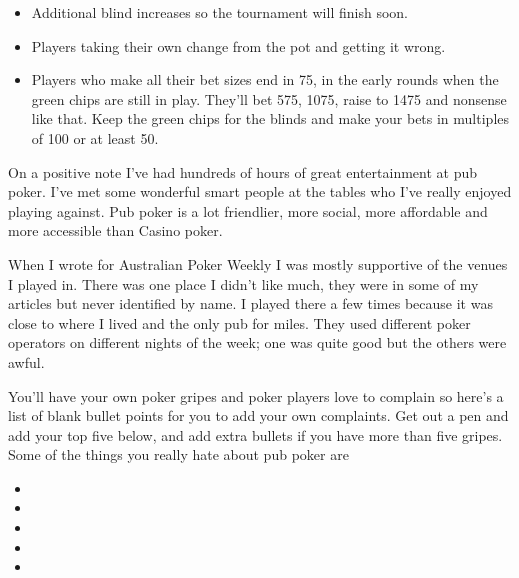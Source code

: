 \begin{itemize}
\item Additional blind increases so the tournament will finish soon.

\item Players taking their own change from the pot and getting it wrong.

\item Players who make all their bet sizes end in 75, in the early rounds
when the green chips are still in play. They'll bet 575, 1075, raise
to 1475 and nonsense like that. Keep the green chips for the blinds
and make your bets in multiples of 100 or at least 50.

\end{itemize}

On a positive note I've
had hundreds of hours of great entertainment at pub poker. I've
met some wonderful smart people at the tables who I've really enjoyed
playing against. Pub poker is a lot friendlier, more social, more
affordable and more accessible than Casino poker.

When I wrote for Australian Poker Weekly I was mostly supportive of
the venues I played in. There was one place I didn't like much, they
were in some of my articles but never identified by name. I played
there a few times because it was close to where I lived and the only
pub for miles. They used different poker operators on different nights
of the week; one was quite good but the others were awful.

You'll have your own poker gripes and poker players love to complain
so here's a list of blank bullet points for you to add your own
complaints. Get out a pen and add your top five below, and add extra
bullets if you have more than five gripes. Some of the things you
really hate about pub poker are

\begin{itemize}

\item


\item


\item


\item


\item


\end{itemize}
